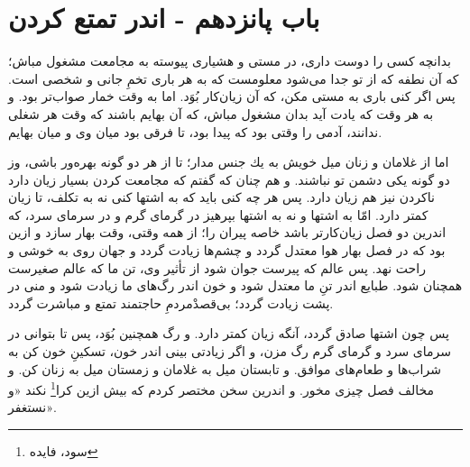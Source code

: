\section*{باب پانزدهم - اندر تمتع کردن}

بدانچه كسى را دوست دارى، در مستى و هشيارى پيوسته به مجامعت مشغول مباش؛ كه آن نطفه كه از تو جدا مى‌شود معلومست كه به هر بارى تخمِ جانى و شخصى است. پس اگر كنى بارى به مستى مكن، كه آن زيان‌كار بُوَد. اما به وقت خمار صواب‌تر بود. و به هر وقت كه يادت آيد بدان مشغول مباش، كه آن بهايم باشند كه وقت هر شغلى ندانند، آدمى را وقتى بود كه پيدا بود، تا فرقى بود  ميان وى و ميان بهايم.

اما از غلامان و زنان ميل خويش به يك جنس مدار؛ تا از هر دو گونه بهره‌ور باشى، وز دو گونه يكى دشمن تو نباشند. و هم چنان كه گفتم كه مجامعت كردن بسيار زيان دارد ناكردن نيز هم زيان دارد. پس هر چه كنى بايد كه به اشتها كنى نه به تكلف، تا زيان كمتر دارد. امّا به اشتها و نه به ‌اشتها بپرهيز در گرماى گرم و در سرماى سرد، كه اندرين دو فصل زيان‌كارتر باشد خاصه پيران را؛ از همه وقتى، وقت بهار سازد و ازين بود كه در فصل بهار هوا معتدل گردد و چشم‌ها زيادت گردد و جهان روى به خوشى و راحت نهد. پس عالم كه پيرست جوان شود از تأثير وى، تن ما كه عالم صغيرست همچنان شود. طبايع اندر تنِ ما معتدل شود و خون اندر رگ‌هاى ما زيادت شود و منى در پشت زيادت گردد؛ بى‌قصدْمردمِ حاجتمند تمتع و مباشرت گردد.

پس چون اشتها صادق گردد، آنگه زيان كمتر دارد. و رگ همچنين بُوَد، پس تا بتوانى در سرماى سرد و گرماى گرم رگ مزن، و اگر زيادتى بينى اندر خون، تسكينِ خون كن به شراب‌ها و طعام‌هاى موافق. و تابستان ميل به غلامان و زمستان ميل به زنان كن. و مخالف فصل چيزى مخور. و اندرين سخن مختصر كردم كه بيش ازين كرا\footnote{سود، فایده} نكند «و نستغفر».

\newpage
